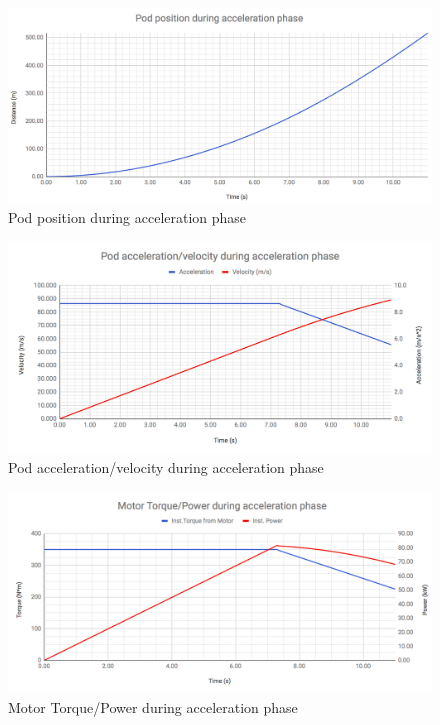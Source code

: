 \documentclass[main.tex]{subfiles}
\begin{document}
    \begin{figure}[H]
        \centering
        \includegraphics[width=\linewidth]{images/pod_position_vs_time_curve}
        \caption{Pod position during acceleration phase}
    \end{figure}
    \begin{figure}[H]
        \centering
        \includegraphics[width=\linewidth]{images/pod_acceleration_velocity_vs_time_curve}
        \caption{Pod acceleration/velocity during acceleration phase}
    \end{figure}
    \begin{figure}[H]
        \centering
        \includegraphics[width=\linewidth]{images/torque_power_vs_time_curve}
        \caption{Motor Torque/Power during acceleration phase}
    \end{figure}
\end{document}
